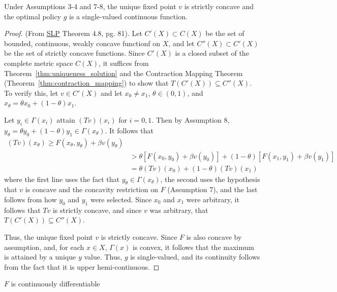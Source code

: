 \documentclass[10pt]{article}
\begin{document}
\begin{theorem}\label{thm:fixed_point_concave}
	Under Assumptions 3-4 and 7-8, the unique fixed point $v$ is strictly concave and the optimal policy $g$ is a single-valued continuous function.
\end{theorem}
\begin{proof}
	(From \href{https://www.hup.harvard.edu/books/9780674750968}{SLP} Theorem 4.8, pg. 81). Let $C'(X) \subset C(X)$ be the set of bounded, continuous, weakly concave functionf on $X$, and let $C''(X) \subset C'(X)$ be the set of strictly concave functions. Since $C'(X)$ is a closed subset of the complete metric space $C(X)$, it suffices from Theorem~\ref{thm:uniqueness_solution} and the Contraction Mapping Theorem (Theorem~\ref{thm:contraction_mapping}) to show that $T(C'(X)) \subseteq C''(X)$. To verify this, let $v \in C'(X)$ and let $x_0 \ne x_1$, $\theta \in (0,1)$, and $x_\theta = \theta x_0 + (1-\theta)x_1$.
	
	Let $y_i \in \Gamma(x_i)$ attain $(Tv)(x_i)$ for $i = 0,1$. Then by Assumption 8, $y_\theta = \theta y_0 + (1-\theta)y_1 \in \Gamma(x_\theta)$. It follows that
	\begin{align*}
		(Tv)(x_\theta) \ge F(x_\theta, y_\theta) + \beta v(y_\theta) \\
		&> \theta [F(x_0,y_0) + \beta v(y_0)] + (1-\theta)[F(x_1,y_1) + \beta v(y_1)] \\
		&= \theta (Tv)(x_0) + (1-\theta)(Tv)(x_1)
	\end{align*} 
	where the first line uses the fact that $y_\theta \in \Gamma(x_\theta)$, the second uses the hypothesis that $v$ is concave and the concavity restriction on $F$ (Assumption 7), and the last follows from how $y_0$ and $y_1$ were selected. Since $x_0$ and $x_1$ were arbitrary, it follows that $Tv$ is strictly concave, and since $v$ was arbitrary, that $T(C'(X)) \subseteq C''(X)$.
	
	Thus, the unique fixed point $v$ is strictly concave. Since $F$ is also concave by assumption, and, for each $x \in X$, $\Gamma(x)$ is convex, it follows that the maximum is attained by a unique $y$ value. Thus, $g$ is single-valued, and its continuity follows from the fact that it is upper hemi-continuous.
\end{proof}

\begin{assumption}
	$F$ is continuously differentiable
\end{assumption}
\end{document}
